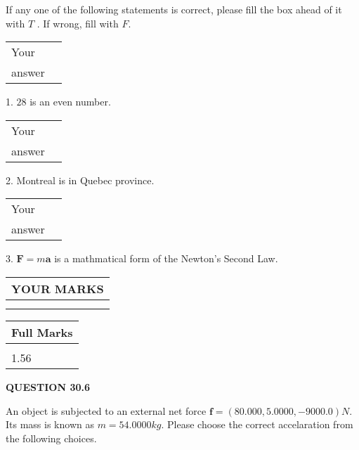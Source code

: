 \documentclass[12pt]{article}
\begin{document}
  
If any one of the following statements is correct, please fill the box ahead of it with $T$ .
If wrong, fill with $F$.
 
\noindent\begin{tabular}{|l|l|}\hline Your&\hspace{.2in} \\ answer&\hspace{.2in} \\ \hline \end{tabular}
1. $ %
28$ is an  %
even number.
 
\noindent\begin{tabular}{|l|l|}\hline Your&\hspace{.2in} \\ answer&\hspace{.2in} \\ \hline \end{tabular}
2.  %
Montreal is in  %
Quebec province.
 
\noindent\begin{tabular}{|l|l|}\hline Your&\hspace{.2in} \\ answer&\hspace{.2in} \\ \hline \end{tabular}
3.  %
$\mathbf{F}=m\mathbf{a}$ is a mathmatical form of
the Newton's Second Law.
 

 
\vspace{0.3in}
  
\vspace{0.2in}
  
\noindent\begin{tabular}{|l|}
\hline
 YOUR MARKS  \\
\hline
 \\ 
 \\ 
\hline
\end{tabular}
\hspace{0.05in} \begin{tabular}{|l|}
\hline
 Full Marks  \\
\hline
 \\ 
1.56 \\
\hline
\end{tabular}
{\textbf{\Large{QUESTION
30.6 
}}}
  
  
 
An object is subjected to an external net force $\mathbf{f}=(
80.000 ,
5.0000,
-9000.0  )N$. Its mass is known as
$m= %
54.0000  kg$. Please choose the correct accelaration
from the following choices.
 
\end{document}

